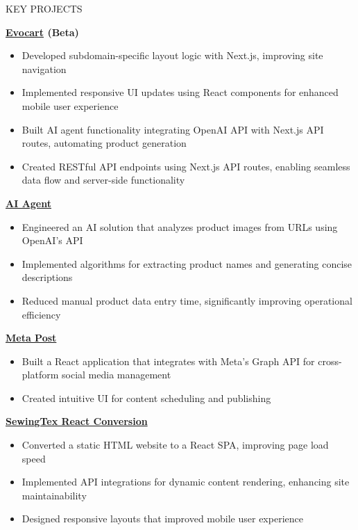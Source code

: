 \documentclass{resume} %
\begin{document}
\begin{rSection}{KEY PROJECTS}
\vspace{-1.25em}
\item \textbf{\href{https://apple.nazarahnaturals.com/}{Evocart} (Beta)} 
\begin{itemize}
    \itemsep -3pt {}
    \item Developed subdomain-specific layout logic with Next.js, improving site navigation
    \item Implemented responsive UI updates using React components for enhanced mobile user experience
    \item Built AI agent functionality integrating OpenAI API with Next.js API routes, automating product generation
    \item Created RESTful API endpoints using Next.js API routes, enabling seamless data flow and server-side functionality
\end{itemize}

\item \textbf{\href{https://github.com/rafidrahman1/ai_agent}{AI Agent}}
\begin{itemize}
    \itemsep -3pt {}
    \item Engineered an AI solution that analyzes product images from URLs using OpenAI's API
    \item Implemented algorithms for extracting product names and generating concise descriptions
    \item Reduced manual product data entry time, significantly improving operational efficiency
\end{itemize}

\item \textbf{\href{https://github.com/rafidrahman1/meta_post}{Meta Post}}
\begin{itemize}
    \itemsep -3pt {}
    \item Built a React application that integrates with Meta's Graph API for cross-platform social media management
    \item Created intuitive UI for content scheduling and publishing
\end{itemize}

\item \textbf{\href{https://sewingtexapparels.com/}{SewingTex React Conversion}}
\begin{itemize}
    \itemsep -3pt {}
    \item Converted a static HTML website to a React SPA, improving page load speed
    \item Implemented API integrations for dynamic content rendering, enhancing site maintainability
    \item Designed responsive layouts that improved mobile user experience
\end{itemize}


\end{rSection}
\end{document}
